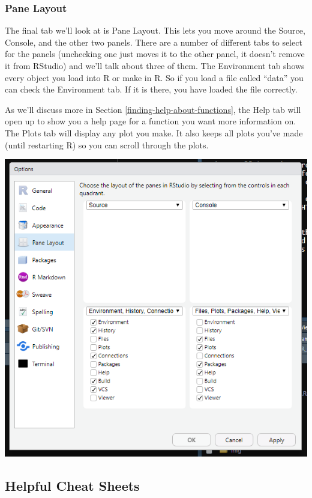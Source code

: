 \documentclass[
]{krantz}
\begin{document}
\hypertarget{pane-layout}{%
\subsubsection{Pane Layout}\label{pane-layout}}

The final tab we'll look at is Pane Layout. This lets you move around the Source, Console, and the other two panels. There are a number of different tabs to select for the panels (unchecking one just moves it to the other panel, it doesn't remove it from RStudio) and we'll talk about three of them. The Environment tab shows every object you load into R or make in R. So if you load a file called ``data'' you can check the Environment tab. If it is there, you have loaded the file correctly.

As we'll discuss more in Section \ref{finding-help-about-functions}, the Help tab will open up to show you a help page for a function you want more information on. The Plots tab will display any plot you make. It also keeps all plots you've made (until restarting R) so you can scroll through the plots.

\includegraphics{images/rstudio_9.PNG}

\hypertarget{helpful-cheat-sheets}{%
\subsection{Helpful Cheat Sheets}\label{helpful-cheat-sheets}}
\end{document}
